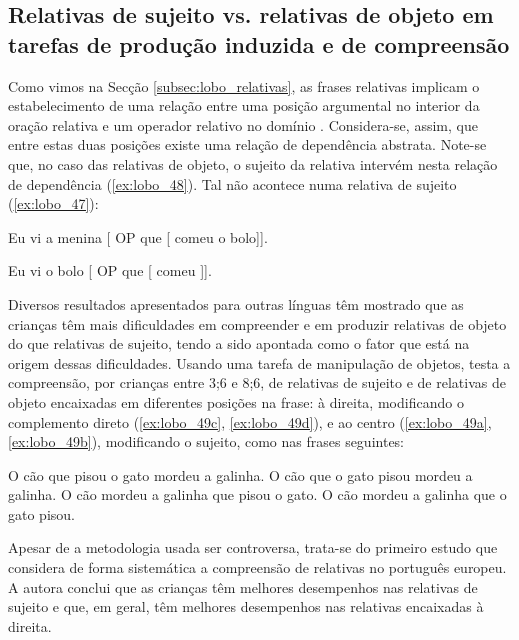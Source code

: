 \documentclass[output=paper]{LSP/langsci}
\begin{document}
\subsection{Relativas de sujeito vs. relativas de objeto em tarefas de produção induzida e de compreensão}

Como vimos na Secção \ref{subsec:lobo_relativas}, as frases relativas implicam o estabelecimento de uma relação entre uma posição argumental no interior da oração relativa e um operador relativo no domínio . Considera-se, assim, que entre estas duas posições existe uma relação de dependência abstrata. Note-se que, no caso das relativas de objeto, o sujeito da relativa intervém nesta relação de dependência (\ref{ex:lobo_48}). Tal não acontece numa relativa de sujeito (\ref{ex:lobo_47}):

\ea\label{ex:lobo_47} Eu vi a menina [\textsubscript{} OP que [\underline{\hspace{1em}} comeu o bolo]].\z

\ea\label{ex:lobo_48} Eu vi o bolo [\textsubscript{} OP que [ comeu \underline{\hspace{1em}}]].\z

Diversos resultados apresentados para outras línguas têm mostrado que as crianças têm mais dificuldades em compreender e em produzir relativas de objeto do que relativas de sujeito, tendo a  sido apontada como o fator que está na origem dessas dificuldades.
Usando uma tarefa de manipulação de objetos, \citet{vasconcelos1993} testa a compreensão, por crianças entre 3;6 e 8;6, de relativas de sujeito e de relativas de objeto encaixadas em diferentes posições na frase: à direita, modificando o complemento direto (\ref{ex:lobo_49c}, \ref{ex:lobo_49d}), e ao centro (\ref{ex:lobo_49a}, \ref{ex:lobo_49b}), modificando o sujeito, como nas frases seguintes:

\ea\label{ex:lobo_49}
\ea\label{ex:lobo_49a} O cão que pisou o gato mordeu a galinha.
\ex\label{ex:lobo_49b} O cão que o gato pisou mordeu a galinha.
\ex\label{ex:lobo_49c} O cão mordeu a galinha que pisou o gato.
\ex\label{ex:lobo_49d} O cão mordeu a galinha que o gato pisou.
\zl

Apesar de a metodologia usada ser controversa, trata-se do primeiro estudo que considera de forma sistemática a compreensão de relativas no português europeu. A autora conclui que as crianças têm melhores desempenhos nas relativas de sujeito e que, em geral, têm melhores desempenhos nas relativas encaixadas à direita.
\end{document}
